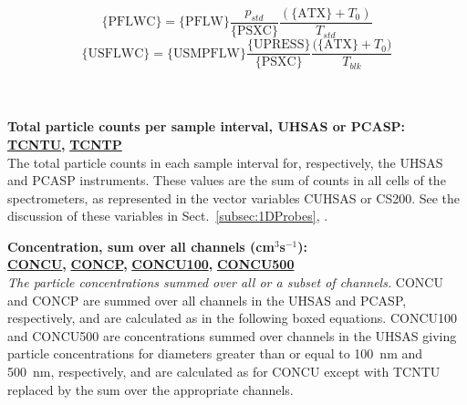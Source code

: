 \begin{hangparagraphs}
{\begin{minipage}[t]{0.9\textwidth}
\begin{equation}
\mathrm{\{PFLWC\}}=\mathrm{\{PFLW\}}\frac{p_{std}}{\mathrm{\{PSXC\}}}\frac{(\mathrm{\{ATX\}}+T_{0})}{T_{std}}\label{eq:12.3}
\end{equation}
\begin{equation}
\mathrm{\{USFLWC\}}=\mathrm{\{USMPFLW\}}\frac{\mathrm{\{UPRESS\}}}{\mathrm{\{PSXC\}}}\frac{\mathrm{(\{ATX\}}+T_{0})}{T_{blk}}\label{eq:12.4}
\end{equation}
%
\end{minipage}} \\
\\

\textbf{Total particle counts per sample interval, UHSAS or PCASP:}\textbf{
}\textbf{\uline{TCNTU}}\textbf{, }\textbf{\uline{TCNTP}}\\
The total particle counts in each sample interval for, respectively,
the UHSAS and PCASP instruments. These values are the sum of counts
in all cells of the spectrometers, as represented in the vector variables
CUHSAS or CS200. See the discussion of these variables in Sect.~\ref{subsec:1DProbes},
.

\textbf{Concentration, sum over all channels (cm$^{3}$s$^{-1}$):}\textbf{
}\textbf{\uline{}}\\
\textbf{\uline{CONCU}}\textbf{, }\textbf{\uline{CONCP}}\textbf{,
}\textbf{\uline{CONCU100}}\textbf{, }\textbf{\uline{CONCU500}}\\
\emph{The particle concentrations summed over all or a subset of channels.}
CONCU and CONCP are summed over all
channels in the UHSAS and PCASP, respectively,
and are calculated as in the following boxed equations. CONCU100 and
CONCU500 are concentrations summed over channels in the UHSAS giving
particle concentrations for diameters greater than or equal to 100~nm
and 500~nm, respectively, and are calculated as for CONCU except
with TCNTU replaced by the sum over the appropriate channels.\\
\\
\end{hangparagraphs}
